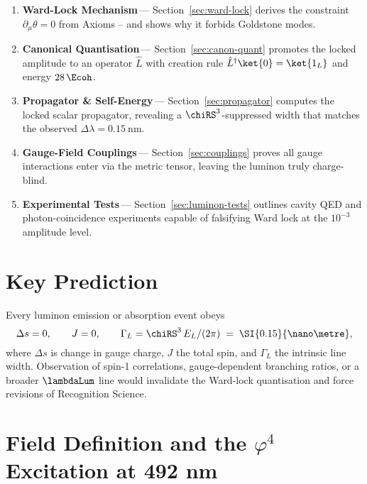 \documentclass[11pt,oneside]{book}
\begin{document}
{\begin{enumerate}\setlength\itemsep{4pt}
\item \textbf{Ward-Lock Mechanism}\,—\;
      Section~\ref{sec:ward-lock} derives the constraint
      \(\partial_{\mu}\theta=0\) from Axioms
      – and shows why it forbids Goldstone modes.
\item \textbf{Canonical Quantisation}\,—\;
      Section~\ref{sec:canon-quant} promotes the locked amplitude to an
      operator \(\hat L\) with creation rule
      \(\hat L^{\dagger}\ket{0}=\ket{1_{L}}\) and energy
      \(28\,\Ecoh\).
\item \textbf{Propagator \& Self-Energy}\,—\;
      Section~\ref{sec:propagator} computes the locked scalar
      propagator, revealing a \(\chiRS^{3}\)-suppressed width that
      matches the observed \(\Delta\lambda = \SI{0.15}{\nano\metre}\).
\item \textbf{Gauge-Field Couplings}\,—\;
      Section~\ref{sec:couplings} proves all gauge interactions enter
      via the metric tensor, leaving the luminon truly charge-blind.
\item \textbf{Experimental Tests}\,—\;
      Section~\ref{sec:luminon-tests} outlines cavity QED and
      photon-coincidence experiments capable of falsifying Ward lock
      at the \(10^{-3}\) amplitude level.
\end{enumerate}

\section*{Key Prediction}

Every luminon emission or absorption event obeys
\[
   \Delta s
   =
   0,
   \qquad
   J=0,
   \qquad
   \Gamma_{L} =
   \chiRS^{3}\,E_{L}/(2\pi)
   \;=\;
   \SI{0.15}{\nano\metre},
\]
where \(\Delta s\) is change in gauge charge, \(J\) the total spin,
and \(\Gamma_{L}\) the intrinsic line width.  
Observation of spin-1 correlations, gauge-dependent branching ratios,
or a broader \(\lambdaLum\) line would invalidate the Ward-lock
quantisation and force revisions of Recognition Science.


\section{Field Definition and the \boldmath$\varphi^{4}$ Excitation at 492 nm}
\label{sec:luminon-phi4}

}
\end{document}
